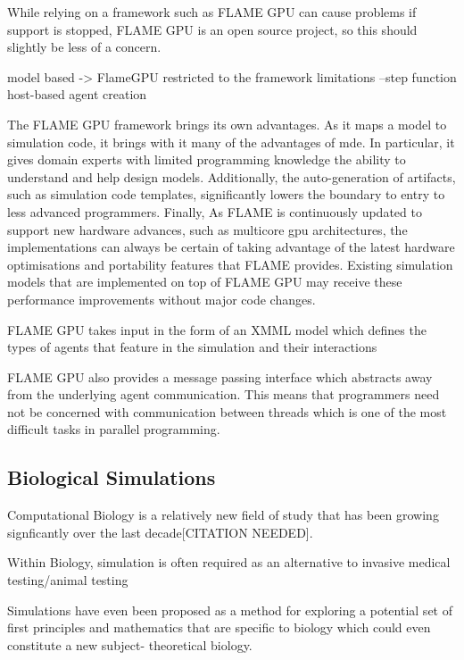 \documentclass{UoYCSproject}
\begin{document}
While relying on a framework such as \gls{FLAME GPU} can cause problems if support is stopped, \gls{FLAME GPU} is an open source project, so this should slightly be less of a concern.

model based -> FlameGPU\cite{flame_keratinocyte}
    restricted to the framework limitations
    --step function host-based agent creation

The \gls{FLAME GPU} framework brings its own advantages.
As it maps a model to simulation code, it brings with it many of the advantages of \acrlong{mde}.
In particular, it gives domain experts with limited programming knowledge the ability to understand and help design models.
Additionally, the auto-generation of artifacts, such as simulation code templates, significantly lowers the boundary to entry to less advanced programmers.
Finally, As FLAME is continuously updated to support new hardware advances, such as multicore \acrshort{gpu} architectures\cite{flame_simulation}, the implementations can always be certain of taking advantage of the latest hardware optimisations and portability features that FLAME provides. Existing simulation models that are implemented on top of \gls{FLAME GPU} may receive these performance improvements without major code changes.


\gls{FLAME GPU} takes input in the form of an XMML model which defines the types of agents that feature in the simulation and their interactions%

\gls{FLAME GPU} also provides a message passing interface which abstracts away from the underlying agent communication.
This means that programmers need not be concerned with communication between threads which is one of the most difficult tasks in parallel programming.

\subsection{Biological Simulations}
Computational Biology is a relatively new field of study that has been growing signficantly over the last decade[CITATION NEEDED].

Within Biology, simulation is often required as an alternative to invasive medical testing/animal testing


Simulations have even been proposed as a method for exploring a potential set of first principles and mathematics that are specific to biology which could even constitute a new subject- theoretical biology\cite{rise_article}.
\end{document}
